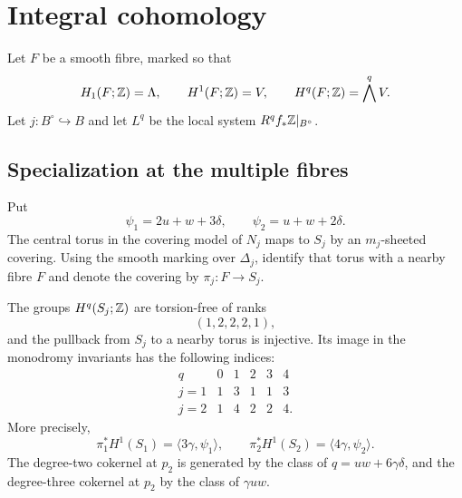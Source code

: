 \section{Integral cohomology}
Let $F$ be a smooth fibre, marked so that
\[
 H_1(F;\mathbb Z)=\Lambda,
 \qquad
 H^1(F;\mathbb Z)=V,
 \qquad
 H^q(F;\mathbb Z)=\bigwedge^qV.
\]
Let $j:B^\circ\hookrightarrow B$ and let $L^q$ be the local system
$R^qf_*\mathbb Z|_{B^\circ}$.

\subsection{Specialization at the multiple fibres}
Put
\[
 \psi_1=2u+w+3\delta,
 \qquad
 \psi_2=u+w+2\delta.
\]
The central torus in the covering model of $N_j$ maps to $S_j$ by an
$m_j$-sheeted covering.  Using the smooth marking over $\Delta_j$, identify
that torus with a nearby fibre $F$ and denote the covering by
$\pi_j:F\to S_j$.

\begin{proposition}\label{prop:finite-specialization}
The groups $H^q(S_j;\mathbb Z)$ are torsion-free of ranks
\[
 (1,2,2,2,1),
\]
and the pullback from $S_j$ to a nearby torus is injective.  Its image in
the monodromy invariants has the following indices:
\[
\begin{array}{c|ccccc}
q&0&1&2&3&4\\ \hline
j=1&1&3&1&1&3\\
j=2&1&4&2&2&4.
\end{array}
\]
More precisely,
\[
 \pi_1^*H^1(S_1)=\langle3\gamma,\psi_1\rangle,
 \qquad
 \pi_2^*H^1(S_2)=\langle4\gamma,\psi_2\rangle.
\]
The degree-two cokernel at $p_2$ is generated by the class of
$q=uw+6\gamma\delta$, and the degree-three cokernel at $p_2$ by the class
of $\gamma uw$.
\end{proposition}


